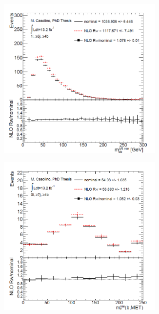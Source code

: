 \begin{figure}[htb!]
\begin{subfigure}{0.5\textwidth}
  \centering
  \includegraphics[width=0.9\textwidth]{figures/Datasamples/ttbb_mbb_mindR_c1l6ji4bi_.png}
  \caption{}
  \label{fig:dat:trf:regiontwob}
\end{subfigure}
\begin{subfigure}{0.5\textwidth}
  \centering
  \includegraphics[width=0.9\textwidth]{figures/Datasamples/ttbb_mtbmin_zoom_c0l7ji4bi_.png}
  \caption{}
  \label{fig:dat:trf:regionfourb}
\end{subfigure}


\end{figure}
